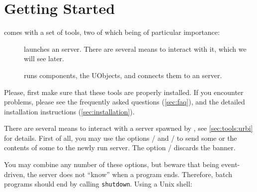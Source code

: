 
\chapter{Getting Started}
\label{sec:tut:started}

\us comes with a set of tools, two of which being of particular
importance:
\begin{description}
\item[] launches an \urbi server.  There are several means
  to interact with it, which we will see later.
\item[] runs \urbi components, the UObjects, and connects
  them to an \urbi server.
\end{description}

Please, first make sure that these tools are properly installed.  If you
encounter problems, please see the frequently asked questions
(\autoref{sec:faq}), and the detailed installation instructions
(\autoref{sec:installation}).


There are several means to interact with a server spawned by ,
see \autoref{sec:tools:urbi} for details.  First of all, you may use the
options / and
/ to send some  or the
contents of some  to the newly run server.  The option
/ discards the banner.

You may combine any number of these options, but beware that being
event-driven, the server does not ``know'' when a program ends.  Therefore,
batch programs should end by calling \lstinline{shutdown}.  Using a Unix
shell:

